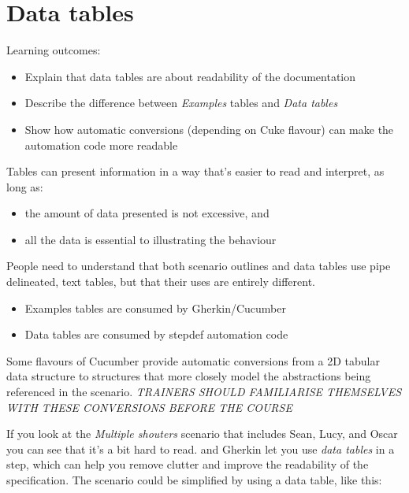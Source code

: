 \chapter*{Data tables}

\ifnotes

    Learning outcomes:
    
    \begin{itemize}
        \item Explain that data tables are about readability of the documentation
        \item Describe the difference between \emph{Examples} tables and \emph{Data tables}
        \item Show how automatic conversions (depending on Cuke flavour) can make the automation code more readable
    \end{itemize}

    Tables can present information in a way that's easier to read and interpret, as long as:
    
    \begin{itemize}
        \item the amount of data presented is not excessive, and
        \item all the data is essential to illustrating the behaviour
    \end{itemize}
    
    People need to understand that both scenario outlines and data tables use pipe delineated, text tables, but that their uses are entirely different.
    
    \begin{itemize}
        \item Examples tables are consumed by Gherkin/Cucumber
        \item Data tables are consumed by stepdef automation code
    \end{itemize}
    
    Some flavours of Cucumber provide automatic conversions from a 2D tabular data structure to  structures that more closely model the abstractions being referenced in the scenario. \emph{TRAINERS SHOULD FAMILIARISE THEMSELVES WITH THESE CONVERSIONS BEFORE THE COURSE}
\fi 

\ifcontent 
    If you look at the \emph{Multiple shouters} scenario that includes Sean, Lucy, and Oscar you can see that it's a bit hard to read. \CUKE{} and Gherkin let you use \emph{data tables} in a step, which can help you remove clutter and improve the readability of the specification. The scenario could be simplified by using a data table, like this:
    
